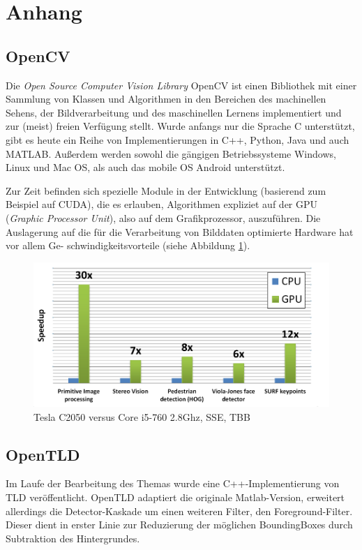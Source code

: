 \section{Anhang}
\subsection*{OpenCV}
Die \textit{Open Source Computer Vision Library} OpenCV ist einen Bibliothek mit einer Sammlung von Klassen und Algorithmen in den Bereichen des machinellen Sehens, der Bildverarbeitung und des maschinellen Lernens implementiert und zur (meist) freien Verfügung stellt. Wurde anfangs nur die Sprache C unterstützt, gibt es heute ein Reihe von Implementierungen in C++, Python, Java und auch MATLAB. Außerdem werden sowohl die gängigen Betriebssysteme Windows, Linux und Mac OS, als auch das mobile OS Android unterstützt.

Zur Zeit befinden sich spezielle Module in der Entwicklung (basierend zum Beispiel auf CUDA), die es erlauben, Algorithmen expliziet auf der GPU (\textit{Graphic Processor Unit}), also auf dem Grafikprozessor, auszuführen. Die Auslagerung auf die für die Verarbeitung von Bilddaten optimierte Hardware hat vor allem Ge- schwindigkeitsvorteile (siehe Abbildung \ref{GPU_Performance}).

\begin{figure}
\centering{}\includegraphics[scale=0.5]{../pictures/GPU_Performance.png}\caption{Tesla C2050 versus Core i5-760 2.8Ghz, SSE, TBB \cite{OCW}}
\label{GPU_Performance}
\end{figure}

\subsection*{OpenTLD}
Im Laufe der Bearbeitung des Themas wurde eine C++-Implementierung von TLD veröffentlicht. OpenTLD adaptiert die originale Matlab-Version, erweitert allerdings die Detector-Kaskade um einen weiteren Filter, den Foreground-Filter. Dieser dient in erster Linie zur Reduzierung der möglichen BoundingBoxes durch Subtraktion des Hintergrundes.

